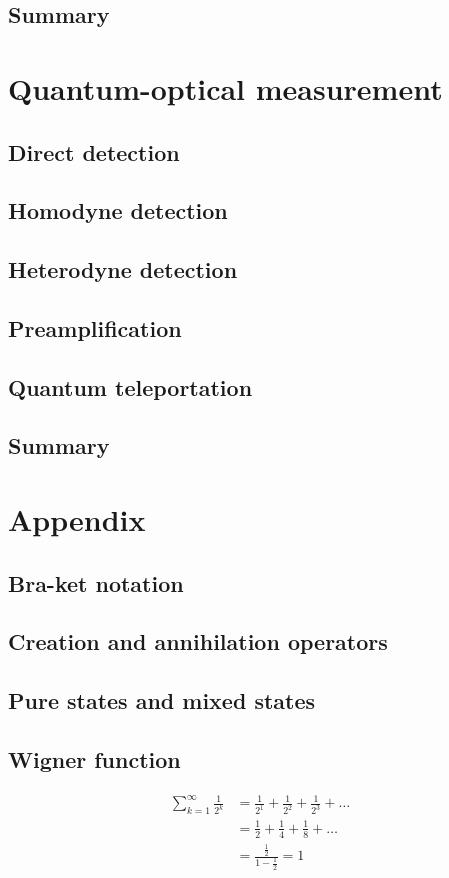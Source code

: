 \documentclass{book}
\begin{document}
\section{Summary}

\chapter{Quantum-optical measurement}
\section{Direct detection}
\section{Homodyne detection}
\section{Heterodyne detection}
\section{Preamplification}
\section{Quantum teleportation}
\section{Summary}

\appendix
\chapter{Appendix}
\section{Bra-ket notation}
\section{Creation and annihilation operators}
\section{Pure states and mixed states}
\section{Wigner function}

\begin{equation}
\begin{aligned}
  \sum_{k=1}^\infty \frac 1 {2^k} &= \frac 1 {2^1} + \frac 1 {2^2} + \frac 1 {2^3} + \dots \\
  &= \frac{1}{2} + \frac{1}{4} + \frac{1}{8} + \dots \\
  &= \frac{\frac 1 2}{1-\frac 1 2} =  1
\end{aligned}
\end{equation}
\end{document}
